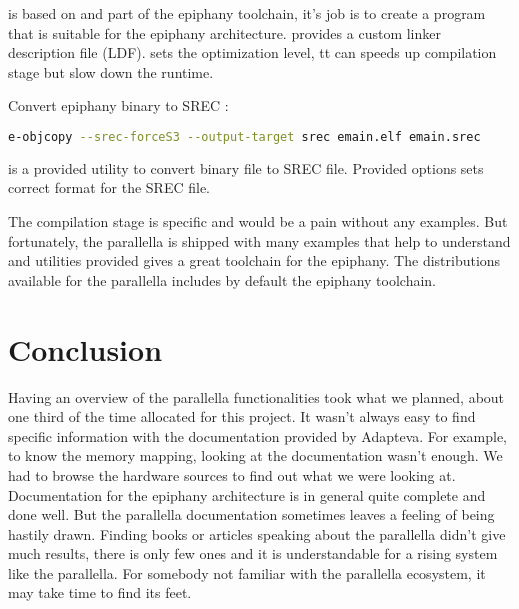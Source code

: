  is based on  and part of the \gls{epiphany} toolchain, it's job is to create a program that is suitable for the \gls{epiphany} architecture.  provides a custom linker description file (\gls{LDF}).  sets the optimization level, tt can speeds up compilation stage but slow down the runtime.

Convert \gls{epiphany} binary to \gls{SREC} :

\begin{lstlisting}[language=bash]
e-objcopy --srec-forceS3 --output-target srec emain.elf emain.srec
\end{lstlisting}

 is a provided utility to convert binary file to \gls{SREC} file. Provided options sets correct format for the \gls{SREC} file.

The compilation stage is specific and would be a pain without any examples. But fortunately, the parallella is shipped with many examples that help to understand and utilities provided gives a great toolchain for the \gls{epiphany}. The distributions available for the parallella includes by default the \gls{epiphany} toolchain.

\section{Conclusion}

Having an overview of the parallella functionalities took what we planned, about one third of the time allocated for this project. It wasn't always easy to find specific information with the documentation provided by Adapteva. For example, to know the memory mapping, looking at the documentation wasn't enough. We had to browse the hardware sources to find out what we were looking at. Documentation for the \gls{epiphany} architecture\cite{epiphanyArch} is in general quite complete and done well. But the parallella documentation sometimes leaves a feeling of being hastily drawn. Finding books or articles speaking about the parallella didn't give much results, there is only few ones and it is understandable for a rising system like the parallella. For somebody not familiar with the parallella ecosystem, it may take time to find its feet.